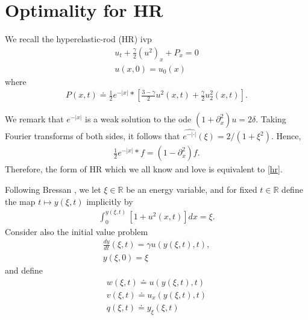 \documentclass[12pt,reqno]{amsart}
\numberwithin{equation}{section}  %
\numberwithin{figure}{section}
\newcommand{\rr}{\mathbb{R}}
\newcommand{\p}{\partial}
\begin{document}
%
%
%
%
%
%
\section{Optimality for HR} 
\label{sec:op-hr}
We recall the hyperelastic-rod (HR) ivp
\begin{gather}
    \label{hr}
    u_{t} + \frac{\gamma}{2}(u^{2})_{x} + P_{x} = 0
    \\
    \label{hr-data}
    u(x,0) = u_{0}(x)
\end{gather}
where
%
%
\begin{equation*}
\begin{split}
P(x,t) \doteq \frac{1}{2}e^{-| x |} * \left [\frac{3 - \gamma}{2}
    u^{2}(x,t) + \frac{\gamma}{2} u_{2}^{2}(x,t) \right ].
\end{split}
\end{equation*}
%
\begin{framed}
We remark that $e^{-| x |}$ is a weak solution to the ode $(1 + \p_{x}^{2})u =
2\delta$. Taking Fourier transforms of both sides, it follows that
$\widehat{e^{-| \cdot |}}(\xi) = 2/(1 + \xi^{2})$. Hence,
%
%
\begin{equation*}
\begin{split}
\frac{1}{2} e^{-| x |} * f = (1 - \p_{x}^2)f.
\end{split}
\end{equation*}
%
%
Therefore, the form of HR which we all know and love is equivalent to
\eqref{hr}.
\end{framed}
%
Following Bressan \cite{Bressan_2007_Global-conserva}, we let $\xi \in \rr$ be an energy variable, and for fixed $t \in \rr$ define the map $t \mapsto y(\xi, t)$ implicitly by 
%
%
\begin{equation}
\label{potent-def}
\begin{split}
    \int_{0}^{y(\xi, t)} [1 + u^{2}(x,t)]dx = \xi.
\end{split}
\end{equation}
%
%
Consider also the initial value problem
%
%
\begin{gather}
    \label{en-eq}
\frac{dy}{dt}(\xi, t) = \gamma u(y(\xi, t), t),
\\
\label{en-data}
y(\xi, 0) = \xi
\end{gather}
%
%
and define
\begin{gather}
    \label{var-1}
    w(\xi, t) \doteq u(y(\xi, t), t)
    \\
    \label{var-2}
    v(\xi, t) \doteq u_{x}(y(\xi, t), t)
    \\
    \label{var-3}
    q(\xi, t) \doteq y_{\xi}(\xi, t)
\end{gather}
\end{document}

